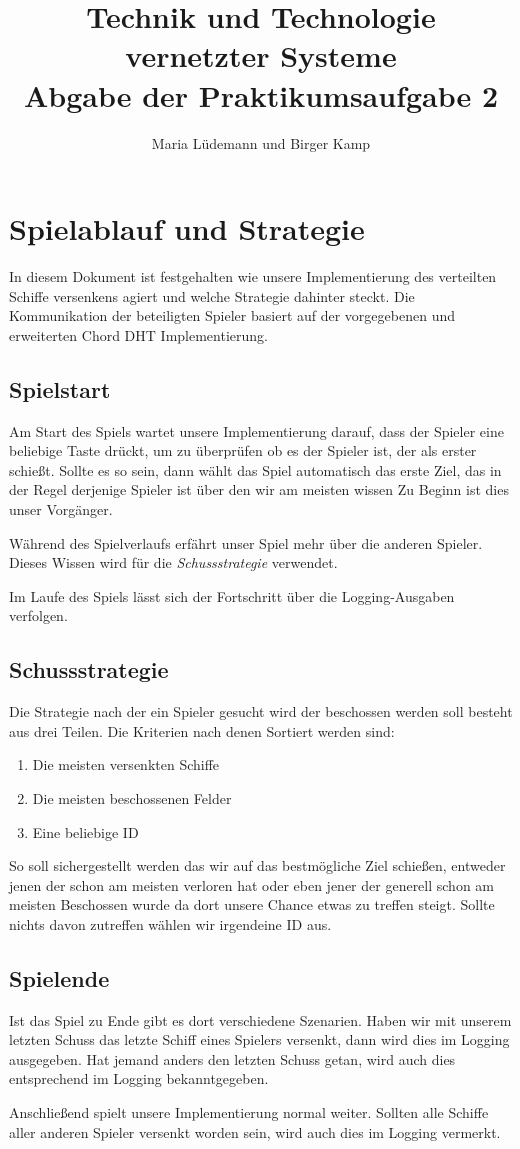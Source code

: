 \documentclass[]{scrartcl}
\title{Technik und Technologie vernetzter Systeme  \\ Abgabe der Praktikumsaufgabe 2}
\author{Maria Lüdemann und Birger Kamp}
\begin{document}
\maketitle

\section{Spielablauf und Strategie}
In diesem Dokument ist festgehalten wie unsere Implementierung des verteilten Schiffe versenkens agiert und welche Strategie dahinter steckt. Die Kommunikation der beteiligten Spieler basiert auf der vorgegebenen und erweiterten Chord DHT Implementierung.


\subsection{Spielstart}
Am Start des Spiels wartet unsere Implementierung darauf, dass der Spieler eine beliebige Taste drückt, um zu überprüfen ob es der Spieler ist, der als erster schießt. Sollte es so sein, dann wählt das Spiel automatisch das erste Ziel, das in der Regel derjenige Spieler ist über den wir am meisten wissen Zu Beginn ist dies unser Vorgänger.

Während des Spielverlaufs erfährt unser Spiel mehr über die anderen Spieler. Dieses Wissen wird für die \textit{Schussstrategie} verwendet.

Im Laufe des Spiels lässt sich der Fortschritt über die Logging-Ausgaben verfolgen.

\subsection{Schussstrategie}
Die Strategie nach der ein Spieler gesucht wird der beschossen werden soll besteht aus drei Teilen. Die Kriterien nach denen Sortiert werden sind:

\begin{enumerate}
\item Die meisten versenkten Schiffe 
\item Die meisten beschossenen Felder
\item Eine beliebige ID 
\end{enumerate}

So soll sichergestellt werden das wir auf das bestmögliche Ziel schießen, entweder jenen der schon am meisten verloren hat oder eben jener der generell schon am meisten Beschossen wurde da dort unsere Chance etwas zu treffen steigt.
Sollte nichts davon zutreffen wählen wir irgendeine ID aus.

\subsection{Spielende}

Ist das Spiel zu Ende gibt es dort verschiedene Szenarien. Haben wir mit unserem letzten Schuss das letzte Schiff eines Spielers versenkt, dann wird dies im Logging ausgegeben. Hat jemand anders den letzten Schuss getan, wird auch dies entsprechend im Logging bekanntgegeben.

Anschließend spielt unsere Implementierung normal weiter. Sollten alle Schiffe aller anderen Spieler versenkt worden sein, wird auch dies im Logging vermerkt.
\end{document}
